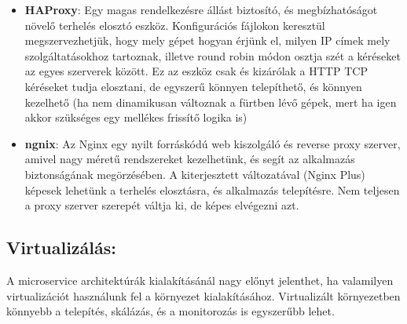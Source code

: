 \documentclass[11pt,magyar,a4paper,oneside,]{report}
\begin{document}
\begin{itemize}
\item
  \textbf{HAProxy}: Egy magas rendelkezésre állást biztosító, és
  megbízhatóságot növelő terhelés elosztó eszköz. Konfigurációs fájlokon
  keresztül megszervezhetjük, hogy mely gépet hogyan érjünk el, milyen
  IP címek mely szolgáltatásokhoz tartoznak, illetve round robin módon
  osztja szét a kéréseket az egyes szerverek között. Ez az eszköz csak
  és kizárólak a HTTP TCP kéréseket tudja elosztani, de egyszerű könnyen
  telepíthető, és könnyen kezelhető (ha nem dinamikusan változnak a
  fürtben lévő gépek, mert ha igen akkor szükséges egy mellékes frissítő
  logika is)
\item
  \textbf{ngnix}: Az Nginx egy nyilt forráskódú web kiszolgáló és
  reverse proxy szerver, amivel nagy méretű rendszereket kezelhetünk, és
  segít az alkalmazás biztonságának megörzésében. A kiterjesztett
  változatával (Nginx Plus) képesek lehetünk a terhelés elosztásra, és
  alkalmazás telepítésre. Nem teljesen a proxy szerver szerepét váltja
  ki, de képes elvégezni azt.
\end{itemize}

\subsection{Virtualizálás:}\label{virtualizuxe1luxe1s}

A microservice architektúrák kialakításánál nagy előnyt jelenthet, ha
valamilyen virtualizációt használunk fel a környezet kialakításához.
Virtualizált környezetben könnyebb a telepítés, skálázás, és a
monitorozás is egyszerűbb lehet.
\end{document}
